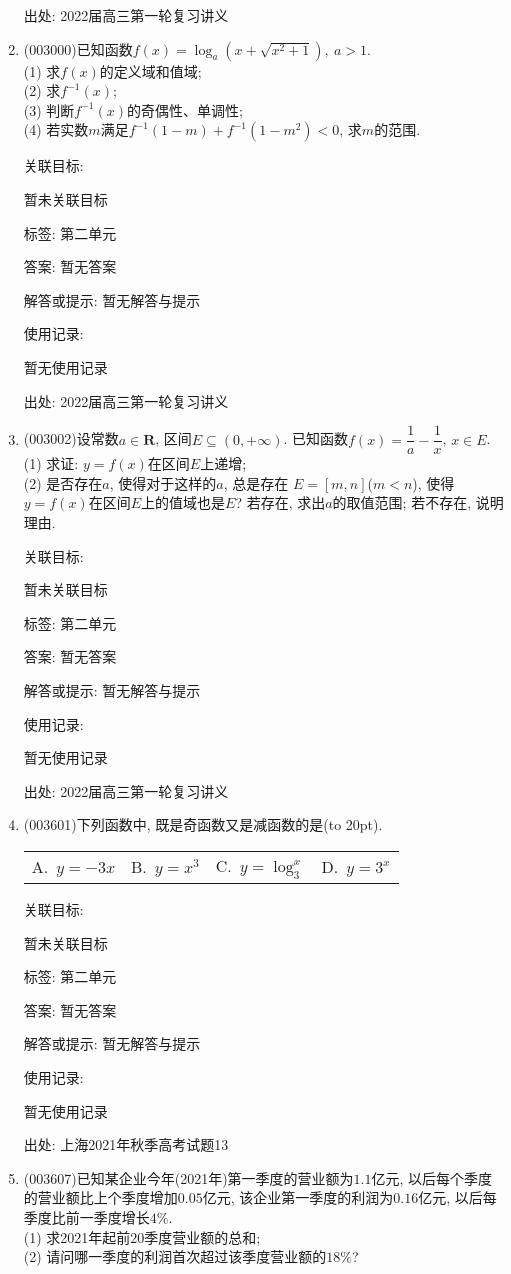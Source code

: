 \documentclass[10pt,a4paper]{article}
\newcommand{\bracket}[1]{(\hbox to #1pt{})}
\newcommand{\fourch}[4]{\par\begin{tabular}{p{.23\textwidth}p{.23\textwidth}p{.23\textwidth}p{.23\textwidth}}
A.~#1 &B.~#2& C.~#3& D.~#4
\end{tabular}}
\begin{document}
\begin{enumerate}[1.]
出处: 2022届高三第一轮复习讲义
\item { (003000)}已知函数$f(x)=\log_a(x+\sqrt{x^2+1}), \ a>1$.\\
(1) 求$f(x)$的定义域和值域;\\
(2) 求$f^{-1}(x)$;\\
(3) 判断$f^{-1}(x)$的奇偶性、单调性;\\
(4) 若实数$m$满足$f^{-1}(1-m)+f^{-1}(1-m^2)<0$, 求$m$的范围.


关联目标:

暂未关联目标



标签: 第二单元

答案: 暂无答案

解答或提示: 暂无解答与提示

使用记录:

暂无使用记录


出处: 2022届高三第一轮复习讲义
\item { (003002)}设常数$a\in \mathbf{R}$, 区间$E\subseteq (0,+\infty)$. 已知函数$f(x)=\dfrac 1a-\dfrac 1x$, $x\in E$.\\
(1) 求证: $y=f(x)$在区间$E$上递增;\\
(2) 是否存在$a$, 使得对于这样的$a$, 总是存在 $E=[m,n]$($m<n$), 使得$y=f(x)$在区间$E$上的值域也是$E$? 若存在, 求出$a$的取值范围; 若不存在, 说明理由.


关联目标:

暂未关联目标



标签: 第二单元

答案: 暂无答案

解答或提示: 暂无解答与提示

使用记录:

暂无使用记录


出处: 2022届高三第一轮复习讲义
\item { (003601)}下列函数中, 既是奇函数又是减函数的是\bracket{20}.
\fourch{$y=-3x$}{$y=x^3$}{$y=\log_3^x$}{$y=3^x$}


关联目标:

暂未关联目标



标签: 第二单元

答案: 暂无答案

解答或提示: 暂无解答与提示

使用记录:

暂无使用记录


出处: 上海2021年秋季高考试题13
\item { (003607)}已知某企业今年(2021年)第一季度的营业额为$1.1$亿元, 以后每个季度的营业额比上个季度增加$0.05$亿元, 该企业第一季度的利润为$0.16$亿元, 以后每季度比前一季度增长$4\%$.\\ 
(1) 求2021年起前$20$季度营业额的总和;\\ 
(2) 请问哪一季度的利润首次超过该季度营业额的$18\%$?



\end{enumerate}
\end{document}
